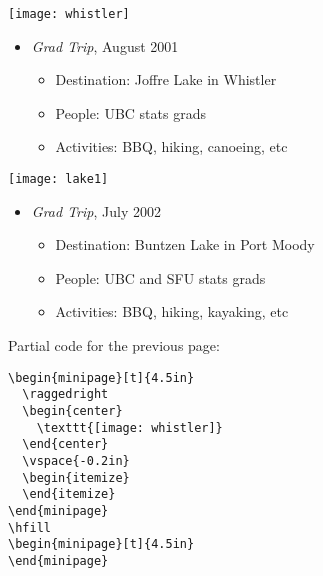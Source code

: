 \documentclass[landscape]{foils}
\begin{document}
\LogoOn
\begin{minipage}[t]{4.5in}
  \raggedright
  \begin{center}
    \texttt{[image: whistler]}
  \end{center}
  \vspace{-0.2in}
  \begin{itemize}
  \item{\it Grad Trip}, August 2001 
  \vspace{-0.2in}
    \begin{itemize}
    \item Destination: Joffre Lake in Whistler \pauseHISplit
    \item People: UBC stats grads \pause 
    \item Activities: BBQ, hiking, canoeing, etc \pauseReplace
  \end{itemize}
 \end{itemize}
\end{minipage}
\hfill
\begin{minipage}[t]{4.5in}
  \raggedright
  \begin{center}
    \texttt{[image: lake1]}
  \end{center}
  \vspace{-0.2in}
  \begin{itemize}
  \item{\it Grad Trip}, July 2002 
  \vspace{-0.2in}
    \begin{itemize}
    \item Destination: Buntzen Lake in Port Moody 
    \item People: UBC and SFU stats grads 
    \item Activities: BBQ, hiking, kayaking, etc 
    \end{itemize}
  \end{itemize}
\end{minipage}

\foilhead{}
Partial code for the previous page:
\begin{verbatim}
\begin{minipage}[t]{4.5in}
  \raggedright
  \begin{center}
    \texttt{[image: whistler]}
  \end{center}
  \vspace{-0.2in}
  \begin{itemize}
  \end{itemize}
\end{minipage}
\hfill
\begin{minipage}[t]{4.5in}
\end{minipage}

\end{verbatim}
\end{document}
